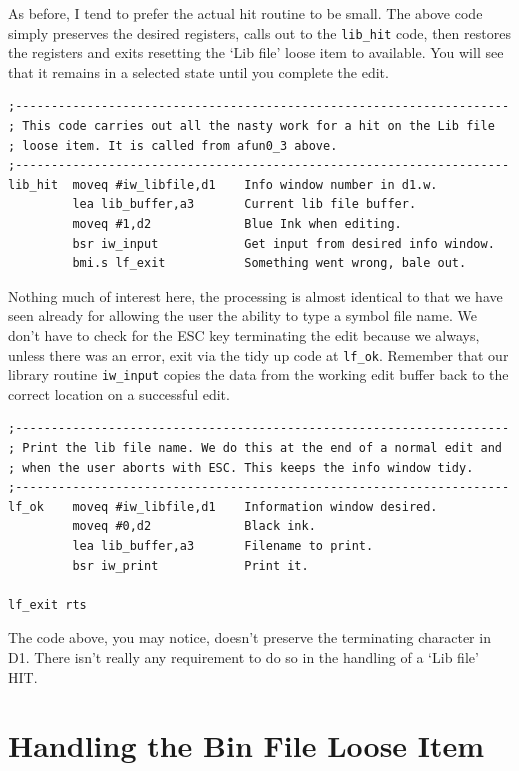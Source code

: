 As before, I tend to prefer the actual hit routine to be small. The
    above code simply preserves the desired registers, calls out to the
 \texttt{lib\_hit} code, then restores the registers and exits
    resetting the `Lib file' loose item to available. You will see that it
    remains in a selected state until you complete the edit.

\begin{lstlisting}[firstnumber=1,]
;---------------------------------------------------------------------
; This code carries out all the nasty work for a hit on the Lib file
; loose item. It is called from afun0_3 above.
;---------------------------------------------------------------------
lib_hit  moveq #iw_libfile,d1    Info window number in d1.w.
         lea lib_buffer,a3       Current lib file buffer.
         moveq #1,d2             Blue Ink when editing.
         bsr iw_input            Get input from desired info window.
         bmi.s lf_exit           Something went wrong, bale out.
\end{lstlisting}

Nothing much of interest here, the processing is almost identical to
    that we have seen already for allowing the user the ability to type a
    symbol file name. We don't have to check for the ESC key terminating the
    edit because we always, unless there was an error, exit via the tidy up
    code at \texttt{lf\_ok}. Remember that our library routine
 \texttt{iw\_input} copies the data from the working edit buffer
    back to the correct location on a successful edit.

\begin{lstlisting}[firstnumber=1,]
;---------------------------------------------------------------------
; Print the lib file name. We do this at the end of a normal edit and
; when the user aborts with ESC. This keeps the info window tidy.
;---------------------------------------------------------------------
lf_ok    moveq #iw_libfile,d1    Information window desired.
         moveq #0,d2             Black ink.
         lea lib_buffer,a3       Filename to print.
         bsr iw_print            Print it.
         
lf_exit rts 
\end{lstlisting}

The code above, you may notice, doesn't preserve the terminating
    character in D1. There isn't really any requirement to do so in the
    handling of a `Lib file' HIT.

\section{Handling the Bin File Loose Item}
\label{ch32-handling-bin-file}%

